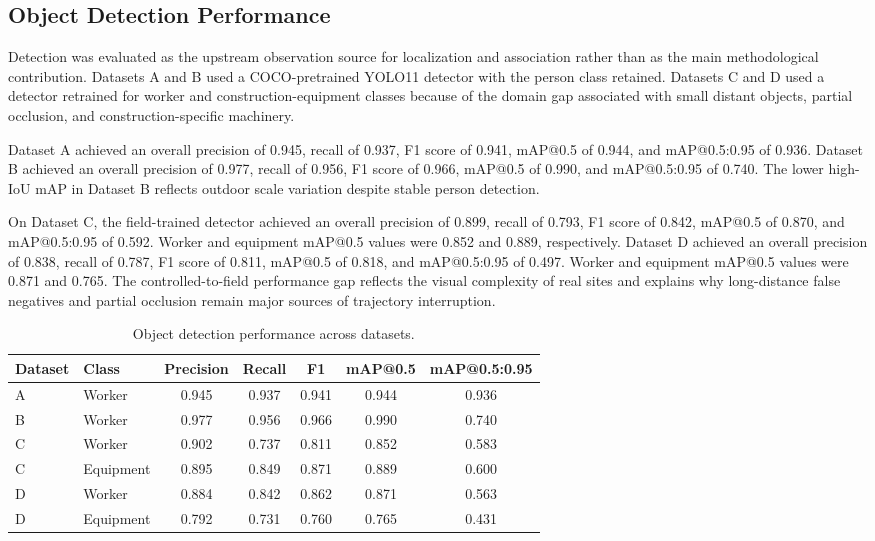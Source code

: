 \subsection{Object Detection Performance}
Detection was evaluated as the upstream observation source for localization and association rather than as the main methodological contribution. Datasets A and B used a COCO-pretrained YOLO11 detector with the person class retained. Datasets C and D used a detector retrained for worker and construction-equipment classes because of the domain gap associated with small distant objects, partial occlusion, and construction-specific machinery.

Dataset A achieved an overall precision of 0.945, recall of 0.937, F1 score of 0.941, mAP@0.5 of 0.944, and mAP@0.5:0.95 of 0.936. Dataset B achieved an overall precision of 0.977, recall of 0.956, F1 score of 0.966, mAP@0.5 of 0.990, and mAP@0.5:0.95 of 0.740. The lower high-IoU mAP in Dataset B reflects outdoor scale variation despite stable person detection.

On Dataset C, the field-trained detector achieved an overall precision of 0.899, recall of 0.793, F1 score of 0.842, mAP@0.5 of 0.870, and mAP@0.5:0.95 of 0.592. Worker and equipment mAP@0.5 values were 0.852 and 0.889, respectively. Dataset D achieved an overall precision of 0.838, recall of 0.787, F1 score of 0.811, mAP@0.5 of 0.818, and mAP@0.5:0.95 of 0.497. Worker and equipment mAP@0.5 values were 0.871 and 0.765. The controlled-to-field performance gap reflects the visual complexity of real sites and explains why long-distance false negatives and partial occlusion remain major sources of trajectory interruption.

\begin{table}[t]
\centering
\caption{Object detection performance across datasets.}
\label{tab:detection}
\begin{tabular}{llccccc}
\toprule
Dataset & Class & Precision & Recall & F1 & mAP@0.5 & mAP@0.5:0.95 \\
\midrule
A & Worker & 0.945 & 0.937 & 0.941 & 0.944 & 0.936 \\
B & Worker & 0.977 & 0.956 & 0.966 & 0.990 & 0.740 \\
C & Worker & 0.902 & 0.737 & 0.811 & 0.852 & 0.583 \\
C & Equipment & 0.895 & 0.849 & 0.871 & 0.889 & 0.600 \\
D & Worker & 0.884 & 0.842 & 0.862 & 0.871 & 0.563 \\
D & Equipment & 0.792 & 0.731 & 0.760 & 0.765 & 0.431 \\
\bottomrule
\end{tabular}
\end{table}

